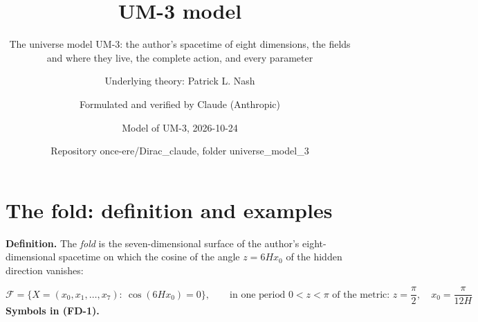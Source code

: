 \documentclass[
  10pt,
]{article}
\title{UM-3 model}
\subtitle{The universe model UM-3: the author's spacetime of eight
dimensions, the fields and where they live, the complete action, and
every parameter}
\author{Underlying theory: Patrick L. Nash \and Formulated and verified
by Claude (Anthropic) \and Model of UM-3, 2026-10-24 \and Repository
once-ere/Dirac\_claude, folder universe\_model\_3}
\date{}
\begin{document}
\maketitle

{
\hypersetup{linkcolor=}
\setcounter{tocdepth}{3}
\tableofcontents
}
\hypertarget{the-fold-definition-and-examples}{%
\section{The fold: definition and
examples}\label{the-fold-definition-and-examples}}

\textbf{Definition.} The \emph{fold} is the seven-dimensional surface of
the author's eight-dimensional spacetime on which the cosine of the
angle \(z = 6Hx_0\) of the hidden direction vanishes:

\[
\mathcal{F} = \big\{X = (x_0, x_1, \dots, x_7):\ \cos(6Hx_0) = 0\big\},\qquad
\text{in one period } 0 < z < \pi\text{ of the metric: } z = \frac{\pi}{2},\quad x_0 = \frac{\pi}{12H} \tag{FD-1}
\] \textbf{Symbols in (FD-1).}
\end{document}

